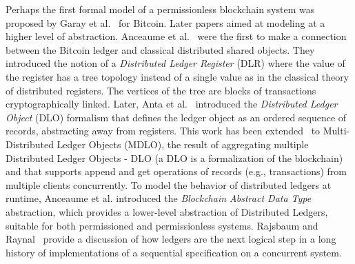Perhaps the first formal model of a permissionless blockchain system was proposed by Garay et al.~\cite{GarayKL2015,GarayKL2015-j2024} for Bitcoin. 
Later papers
aimed at modeling at a higher level of abstraction.
Anceaume et al.~\cite{AnceaumeLPT17} were the first to make a connection between the Bitcoin ledger and classical distributed shared objects. They introduced the notion of  a \emph{ Distributed Ledger Register} (DLR) where the value of the register has a tree topology instead of a single value as in the classical theory of distributed registers. 
The vertices of the tree are blocks of transactions cryptographically linked. 
Later, Anta et al.~\cite{AntaKGN18} introduced the {\em Distributed Ledger Object} (DLO) formalism that  defines the ledger object as an ordered sequence of records, abstracting away from registers.  This work has been extended~\cite{AntaGN19} to Multi-Distributed Ledger Objects (MDLO), the result of aggregating multiple Distributed Ledger Objects - DLO (a DLO is a formalization of the blockchain) and that supports append and get operations of records (e.g., transactions)  from multiple clients concurrently.
To model the behavior of distributed ledgers at runtime, Anceaume et al.\cite{AnceaumePLPP19} introduced the {\em Blockchain Abstract Data Type} abstraction, which provides a lower-level abstraction of Distributed Ledgers, suitable for both permissioned and permissionless systems.
Rajsbaum and Raynal~\cite{RR19cacm} provide a discussion of how ledgers are the next logical step in a long history of implementations of a sequential specification on a concurrent system. 
%
